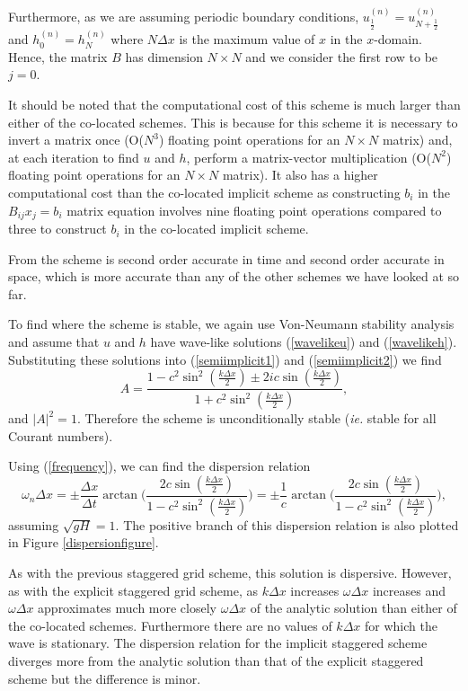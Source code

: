 \documentclass[a4paper, 10pt, notitlepage]{article}
\begin{document}
Furthermore, as we are assuming periodic boundary conditions, $u_{\frac{1}{2}}^{(n)} = u_{N + \frac{1}{2}}^{(n)}$ and $h_{0}^{(n)} = h_{N}^{(n)}$ where $N\Delta x$ is the maximum value of $x$ in the $x$-domain. Hence, the matrix $B$ has dimension $N \times N$ and we consider the first row to be $j = 0$.

It should be noted that the computational cost of this scheme is much larger than either of the co-located schemes. This is because for this scheme it is necessary to invert a matrix once (O($N^{3}$) floating point operations for an $N \times N$ matrix) and, at each iteration to find $u$ and $h$, perform a matrix-vector multiplication (O($N^{2}$) floating point operations for an $N \times N$ matrix). It also has a higher computational cost than the co-located implicit scheme as constructing $b_{i}$ in the $B_{ij}x_{j} = b_{i}$ matrix equation involves nine floating point operations compared to three to construct $b_{i}$ in the co-located implicit scheme.

From \cite{implicit} the scheme is second order accurate in time and second order accurate in space, which is more accurate than any of the other schemes we have looked at so far.

To find where the scheme is stable, we again use Von-Neumann stability analysis and assume that $u$ and $h$ have wave-like solutions (\ref{wavelikeu}) and (\ref{wavelikeh}). Substituting these solutions into (\ref{semiimplicit1}) and (\ref{semiimplicit2}) we find
\begin{equation}
A = \frac{1 - c^{2}\sin^{2}(\frac{k\Delta x}{2}) \pm 2ic\sin(\frac{k\Delta x}{2})}{1 + c^{2}\sin^{2}(\frac{k\Delta x}{2})},
\end{equation}
and $\lvert A \rvert^{2} = 1$. Therefore the scheme is unconditionally stable (\textit{ie.} stable for all Courant numbers).

Using (\ref{frequency}), we can find the dispersion relation
\begin{equation}
\omega_{n} \Delta x = \pm\frac{\Delta x}{\Delta t} \arctan\bigg(\frac{2 c \sin(\frac{k\Delta x}{2})}{1 - c^{2} \sin^{2}(\frac{k\Delta x}{2})}\bigg) = \pm\frac{1}{c} \arctan\bigg(\frac{2 c \sin(\frac{k\Delta x}{2})}{1 - c^{2} \sin^{2}(\frac{k\Delta x}{2})}\bigg),
\end{equation}
assuming $\sqrt{gH} = 1$. The positive branch of this dispersion relation is also plotted in Figure \ref{dispersionfigure}. 

As with the previous staggered grid scheme, this solution is dispersive. However, as with the explicit staggered grid scheme, as $k\Delta x$ increases $\omega\Delta x$ increases and $\omega\Delta x$ approximates much more closely $\omega\Delta x$ of the analytic solution than either of the co-located schemes. Furthermore there are no values of $k\Delta x$ for which the wave is stationary. The dispersion relation for the implicit staggered scheme diverges more from the analytic solution than that of the explicit staggered scheme but the difference is minor. 
\end{document}
